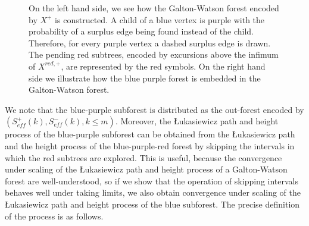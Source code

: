 \begin{figure}
\begin{subfigure}{.5\textwidth}
\end{subfigure}
\caption{On the left hand side, we see how the Galton-Watson forest encoded by $X^+$ is constructed. A child of a blue vertex is purple with the probability of a surplus edge being found instead of the child. Therefore, for every purple vertex a dashed surplus edge is drawn. The pending red subtrees, encoded by excursions above the infimum of $X^{red,+}$, are represented by the red symbols. On the right hand side we illustrate how the blue purple forest is embedded in the Galton-Watson forest.}
\label{fig.blueredpurpletrees}
\end{figure}


We note that the blue-purple subforest is distributed as the out-forest encoded by $(S^+_{eff}(k),S^-_{eff}(k), k\leq m)$. Moreover, the \L ukasiewicz path and height process of the blue-purple subforest can be obtained from the \L ukasiewicz path and the height process of the blue-purple-red forest by skipping the intervals in which the red subtrees are explored. This is useful, because the convergence under scaling of the \L ukasiewicz path and height process of a Galton-Watson forest are well-understood, so if we show that the operation of skipping intervals behaves well under taking limits, we also obtain convergence under scaling of the \L ukasiewicz path and height process of the blue subforest. 
The precise definition of the process is as follows.
